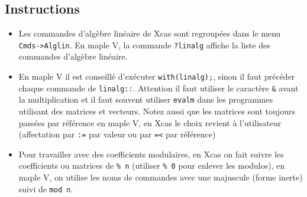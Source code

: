 \documentclass[a4paper,11pt]{book}
\begin{document}
\begin{giacjshere}
\subsection{Instructions}
\begin{itemize}
\item Les commandes d'alg\`ebre lin\'eaire de Xcas sont
regroup\'ees dans le menu {\tt Cmds->Alglin}.
En maple V, la commande {\tt ?linalg} affiche
la liste des commandes d'algèbre linéaire. 
\item En maple V il est conseillé d'exécuter {\tt with(linalg);},
sinon il faut précéder
chaque commande de {\tt linalg::}.
Attention
il faut utiliser le caractère {\tt \&} avant la multiplication
et il faut souvent utiliser {\tt evalm} dans les programmes
utilisant des matrices et vecteurs. Notez aussi que les
matrices sont toujours pass\'ees par r\'ef\'erence en maple V,
en Xcas le choix revient \`a l'utilisateur (affectation par \verb|:=|
par valeur ou par \verb|=<| par r\'ef\'erence)
\item Pour travailler avec des
coefficients modulaires, en Xcas
on fait suivre les coefficients ou matrices de {\tt \% n}
(utiliser \verb|% 0| pour enlever les modulos),
en maple V, on utilise les noms de commandes
avec une majuscule (forme inerte) suivi de {\tt mod n}.
\end{itemize}



\end{giacjshere}
\end{document}
